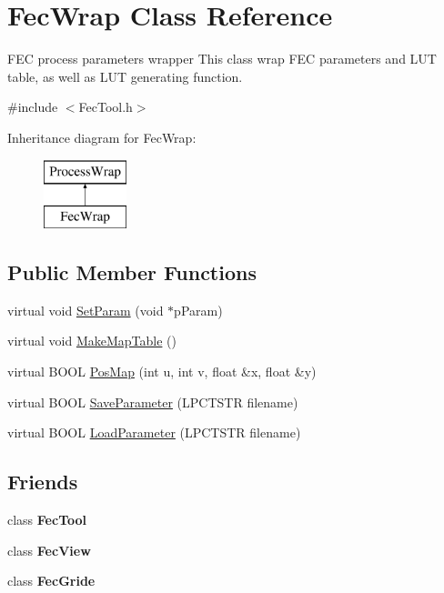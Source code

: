 \hypertarget{class_fec_wrap}{}\section{Fec\+Wrap Class Reference}
\label{class_fec_wrap}


F\+EC process parameters wrapper This class wrap F\+EC parameters and L\+UT table, as well as L\+UT generating function.  




{\ttfamily \#include $<$Fec\+Tool.\+h$>$}

Inheritance diagram for Fec\+Wrap\+:\begin{figure}[H]
\begin{center}
\leavevmode
\includegraphics[height=2.000000cm]{class_fec_wrap}
\end{center}
\end{figure}
\subsection*{Public Member Functions}
\begin{DoxyCompactItemize}
\item 
virtual void \mbox{\hyperlink{class_fec_wrap_a989dbae7d3f292f4e686eee8f19a1ad7}{Set\+Param}} (void $\ast$p\+Param)
\item 
virtual void \mbox{\hyperlink{class_fec_wrap_ac1c213fd03716ce0bb6430e2d2bf7962}{Make\+Map\+Table}} ()
\item 
virtual B\+O\+OL \mbox{\hyperlink{class_fec_wrap_a50575c4f361b71e6de2e8c1073b4a26a}{Pos\+Map}} (int u, int v, float \&x, float \&y)
\item 
virtual B\+O\+OL \mbox{\hyperlink{class_fec_wrap_abd377e205b42ec6725293c3c9ff76a34}{Save\+Parameter}} (L\+P\+C\+T\+S\+TR filename)
\item 
virtual B\+O\+OL \mbox{\hyperlink{class_fec_wrap_a3f55d86b6b99108b360b66d1d180a66c}{Load\+Parameter}} (L\+P\+C\+T\+S\+TR filename)
\end{DoxyCompactItemize}
\subsection*{Friends}
\begin{DoxyCompactItemize}
\item 
\mbox{\label{class_fec_wrap_aee89ac5ae8a164efc12e3ffdba0f5cc6}} 
class {\bfseries Fec\+Tool}
\item 
\mbox{\label{class_fec_wrap_a6bf8ef1e5b278887294b17a7aa714e7b}} 
class {\bfseries Fec\+View}
\item 
\mbox{\label{class_fec_wrap_a8dfb14a6a11e1fad081be201e28a0f37}} 
class {\bfseries Fec\+Gride}
\end{DoxyCompactItemize}
